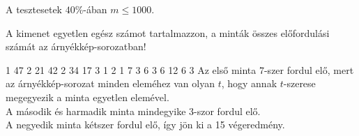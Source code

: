 \smallskip

A tesztesetek $40\%$-ában $m \leq 1000$.


A kimenet egyetlen egész számot tartalmazzon, a minták összes előfordulási számát az árnyékkép-sorozatban!


1 47
2 21 42
2 34 17
3 1 2 1
7 3 6 3 6 12 6 3
\sampleCOMMENT
Az első minta 7-szer fordul elő, mert az árnyékkép-sorozat minden eleméhez van olyan $t$, hogy annak $t$-szerese megegyezik a minta egyetlen elemével.\\
A második és harmadik minta mindegyike 3-szor fordul elő.\\
A negyedik minta kétszer fordul elő, így jön ki a 15 végeredmény.
\sampleEND


 